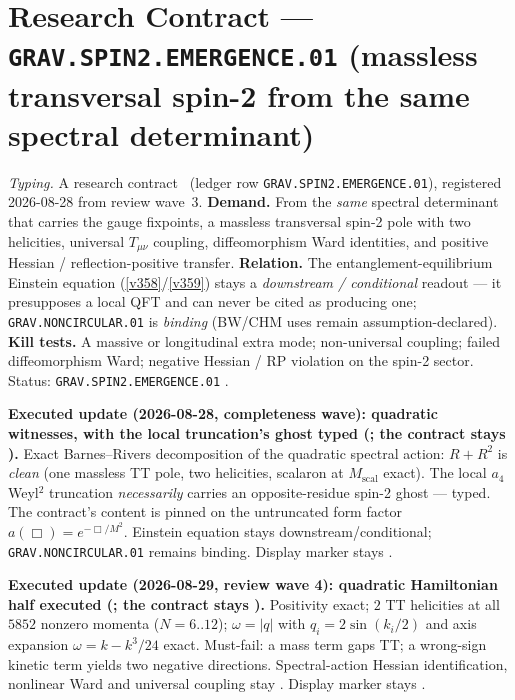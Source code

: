 \documentclass[11pt,a4paper]{article}
\begin{document}
\section*{Research Contract --- \texttt{GRAV.SPIN2.EMERGENCE.01} (massless transversal spin-2 from the same spectral determinant)}
\noindent\emph{Typing.} A research contract \mO\ (ledger row \texttt{GRAV.SPIN2.EMERGENCE.01}),
registered 2026-08-28 from review wave~3.  \textbf{Demand.}  From the
\emph{same} spectral determinant that carries the gauge fixpoints, a massless transversal
spin-2 pole with two helicities, universal $T_{\mu\nu}$ coupling, diffeomorphism Ward identities,
and positive Hessian / reflection-positive transfer.  \textbf{Relation.}  The
entanglement-equilibrium Einstein equation (\vref{v358}/\vref{v359}) stays a
\emph{downstream / conditional} readout --- it presupposes a local QFT and can never be cited as
producing one; \texttt{GRAV.NONCIRCULAR.01} is \emph{binding} (BW/CHM uses remain
assumption-declared).  \textbf{Kill tests.}  A massive or longitudinal extra mode; non-universal
coupling; failed diffeomorphism Ward; negative Hessian / RP violation on the spin-2 sector.
Status: \texttt{GRAV.SPIN2.EMERGENCE.01} \mO.

\par\smallskip\noindent\textbf{Executed update (2026-08-28, completeness wave): quadratic
witnesses, with the local truncation's ghost typed
(; the contract stays \mO).}
Exact Barnes--Rivers decomposition of the quadratic spectral action: $R{+}R^2$ is \emph{clean}
(one massless TT pole, two helicities, scalaron at $M_{\mathrm{scal}}$ exact).  The local $a_4$
Weyl$^2$ truncation \emph{necessarily} carries an opposite-residue spin-2 ghost --- typed.
The contract's content is pinned on the untruncated form factor $a(\Box)=e^{-\Box/M^2}$.
Einstein equation stays downstream/conditional; \texttt{GRAV.NONCIRCULAR.01} remains binding.
Display marker stays \mO.

\par\smallskip\noindent\textbf{Executed update (2026-08-29, review wave 4): quadratic Hamiltonian
half executed
(; the contract stays \mO).}
Positivity exact; $2$ TT helicities at all $5852$ nonzero momenta ($N=6..12$);
$\omega=|q|$ with $q_i=2\sin(k_i/2)$ and axis expansion $\omega=k-k^3/24$ exact.
Must-fail: a mass term gaps TT; a wrong-sign kinetic term yields two negative directions.
Spectral-action Hessian identification, nonlinear Ward and universal coupling stay \mO.
Display marker stays \mO.
\end{document}
